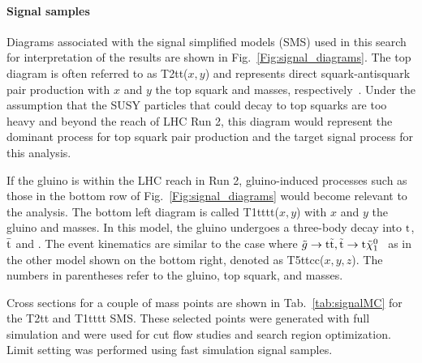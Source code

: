 \paragraph{Signal samples}

Diagrams associated with the signal simplified models (SMS) used in this 
search for interpretation of the results are shown in Fig.~\ref{Fig:signal_diagrams}.
The top diagram is often referred to as T2tt($x,y$) and represents
direct squark-antisquark pair production with $x$ and $y$ the top squark and 
\chiOneZero masses, respectively~\cite{CMS-SMS-paper}.
Under the assumption that the SUSY particles that could decay to top squarks 
are too heavy and beyond the reach of LHC Run 2, this diagram would 
represent the dominant process for top squark pair production and the target
signal process for this analysis.

If the gluino is within the LHC reach in Run 2, gluino-induced processes such 
as those in the bottom row of Fig.~\ref{Fig:signal_diagrams} would become
relevant to the analysis. The bottom left diagram is called
T1tttt($x,y$) with $x$ and $y$ the gluino and \chiOneZero masses.
In this model, the gluino undergoes a three-body decay into \ensuremath{\rm t}, \ensuremath{\rm \bar{t}} and 
\chiOneZero. The event kinematics are similar to the case
where
$\tilde{g}\to\mathrm{t}\tilde{{\mathrm t}}, \tilde{{\mathrm t}}\to\mathrm{t}\tilde{\chi}^{0}_{1}$~\cite{CMS-SMS-paper}
as in the other model shown on the bottom right, denoted as 
T5ttcc($x,y,z$).
The numbers in parentheses refer to the gluino, top squark, and 
\chiOneZero masses. 


Cross sections for a couple of mass points are shown in 
Tab.~\ref{tab:signalMC} for the T2tt and T1tttt SMS. 
These selected points were generated with full simulation and were used for
cut flow studies and search region optimization. Limit setting was performed
using fast simulation signal samples.


